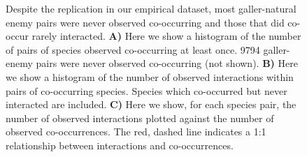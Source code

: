 \documentclass[12pt]{article}
\begin{document}
  \begin{figure}[h!]
      \caption{Despite the replication in our empirical dataset, most galler-natural enemy pairs were never observed co-occurring and those that did co-occur rarely interacted. \textbf{A)} Here we show a histogram of the number of pairs of species observed co-occurring at least once. 9794 galler-enemy pairs were never observed co-occurring (not shown).
      \textbf{B)} Here we show a histogram of the number of observed interactions within pairs of co-occurring species. Species which co-occurred but never interacted are included. 
      \textbf{C)} Here we show, for each species pair, the number of observed interactions plotted against the number of observed co-occurrences. The red, dashed line indicates a 1:1 relationship between interactions and co-occurrences.}
      \label{histograms}
      \begin{center}

\end{center}
\end{figure}
\end{document}
